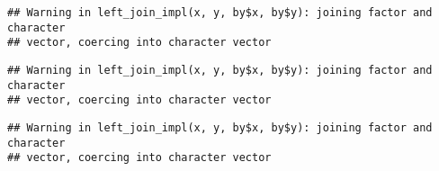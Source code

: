 \documentclass[10pt]{report}
\newenvironment{Shaded}{}{}
\newcommand{\KeywordTok}[1]{\textcolor[rgb]{0.00,0.44,0.13}{\textbf{{#1}}}}
\newcommand{\DataTypeTok}[1]{\textcolor[rgb]{0.56,0.13,0.00}{{#1}}}
\newcommand{\StringTok}[1]{\textcolor[rgb]{0.25,0.44,0.63}{{#1}}}
\newcommand{\NormalTok}[1]{{#1}}
\begin{document}
\begin{verbatim}
## Warning in left_join_impl(x, y, by$x, by$y): joining factor and character
## vector, coercing into character vector
\end{verbatim}

\begin{Shaded}
\end{Shaded}

\begin{verbatim}
## Warning in left_join_impl(x, y, by$x, by$y): joining factor and character
## vector, coercing into character vector
\end{verbatim}

\begin{verbatim}
## Warning in left_join_impl(x, y, by$x, by$y): joining factor and character
## vector, coercing into character vector
\end{verbatim}

\begin{Shaded}
\end{Shaded}
\end{document}
